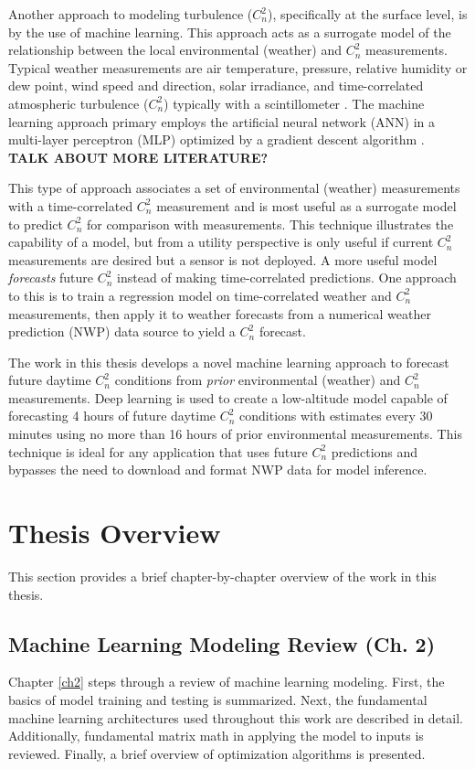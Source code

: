 Another approach to modeling turbulence ($C_{n}^{2}$), specifically at the surface level, is by the use of machine learning. This approach acts as a surrogate model of the relationship between the local environmental (weather) and $C_{n}^{2}$ measurements. Typical weather measurements are air temperature, pressure, relative humidity or dew point, wind speed and direction, solar irradiance, and time-correlated atmospheric turbulence ($C_{n}^{2}$) typically with a scintillometer \cite{Jellen:20, Su:20, Wang:2014}. The machine learning approach primary employs the artificial neural network (ANN) in a multi-layer perceptron (MLP) optimized by a gradient descent algorithm \cite{Su:20, Wang:2014}. \textbf{TALK ABOUT MORE LITERATURE?}

This type of approach associates a set of environmental (weather) measurements with a time-correlated $C_{n}^{2}$ measurement and is most useful as a surrogate model to predict $C_{n}^{2}$ for comparison with measurements. This technique illustrates the capability of a model, but from a utility perspective is only useful if current $C_{n}^{2}$ measurements are desired but a sensor is not deployed. A more useful model \emph{forecasts} future $C_{n}^{2}$ instead of making time-correlated predictions. One approach to this is to train a regression model on time-correlated weather and $C_{n}^{2}$ measurements, then apply it to weather forecasts from a numerical weather prediction (NWP) data source to yield a $C_{n}^{2}$ forecast.

The work in this thesis develops a novel machine learning approach to forecast future daytime $C_{n}^{2}$ conditions from \emph{prior} environmental (weather) and $C_{n}^{2}$ measurements. Deep learning is used to create a low-altitude model capable of forecasting 4 hours of future daytime $C_{n}^{2}$ conditions with estimates every 30 minutes using no more than 16 hours of prior environmental measurements. This technique is ideal for any application that uses future $C_{n}^{2}$ predictions and bypasses the need to download and format NWP data for model inference.

\section{Thesis Overview}
This section provides a brief chapter-by-chapter overview of the work in this thesis.

\subsection{Machine Learning Modeling Review (Ch. 2)}
Chapter \ref{ch2} steps through a review of machine learning modeling. First, the basics of model training and testing is summarized. Next, the fundamental machine learning architectures used throughout this work are described in detail. Additionally, fundamental matrix math in applying the model to inputs is reviewed.  Finally, a brief overview of optimization algorithms is presented.

